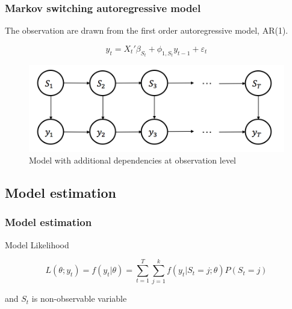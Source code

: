 \documentclass{beamer}
\begin{document}
\begin{frame}
\frametitle{Markov switching autoregressive model}
The observation are drawn from the first order autoregressive model, AR(1).

$$y_{t} = {X_{t}}' \beta_{S_{t}} + \phi_{1,S_{t}} y_{t-1} + \varepsilon_{t}$$

\begin{figure}
	\includegraphics[width=0.5\linewidth]{msm-ar}
	\caption{Model with additional dependencies at observation level}
\end{figure}
\end{frame}

\subsection{Model estimation}
\begin{frame}
\frametitle{Model estimation}







Model Likelihood

$$L(\theta;y_{t}) = f(y_{t}|\theta) = \sum_{t=1}^{T}\sum_{j=1}^{k} f(y_{t}|S_{t}=j;\theta)P(S_{t}=j)$$

and $S_{t}$ is non-observable variable

\end{frame}

\end{document}
